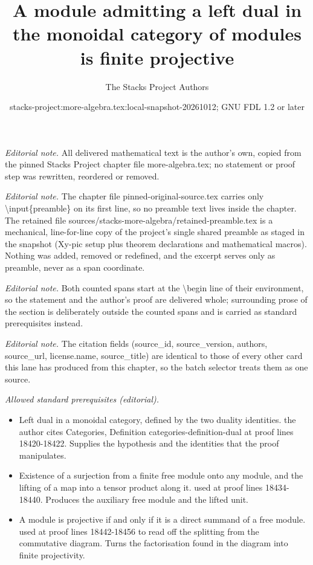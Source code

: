 \documentclass[10pt,a4paper]{amsart}
\title{A module admitting a left dual in the monoidal category of modules is finite projective}
\author{The Stacks Project Authors}
\date{stacks-project:more-algebra.tex:local-snapshot-20261012; GNU FDL 1.2 or later}
\theoremstyle{plain}
\theoremstyle{definition}
\theoremstyle{remark}
\numberwithin{equation}{subsection}
\begin{document}
\maketitle
\setcounter{subsection}{1}
\noindent\textit{Editorial note.} All delivered mathematical text is the author's own, copied from the pinned Stacks Project chapter file more-algebra.tex; no statement or proof step was rewritten, reordered or removed.\par\medskip
\noindent\textit{Editorial note.} The chapter file pinned-original-source.tex carries only \textbackslash{}input\{preamble\} on its first line, so no preamble text lives inside the chapter. The retained file sources/stacks-more-algebra/retained-preamble.tex is a mechanical, line-for-line copy of the project's single shared preamble as staged in the snapshot (Xy-pic setup plus theorem declarations and mathematical macros). Nothing was added, removed or redefined, and the excerpt serves only as preamble, never as a span coordinate.\par\medskip
\noindent\textit{Editorial note.} Both counted spans start at the \textbackslash{}begin line of their environment, so the statement and the author's proof are delivered whole; surrounding prose of the section is deliberately outside the counted spans and is carried as standard prerequisites instead.\par\medskip
\noindent\textit{Editorial note.} The citation fields (source\_id, source\_version, authors, source\_url, license.name, source\_title) are identical to those of every other card this lane has produced from this chapter, so the batch selector treats them as one source.\par\medskip
\noindent\textit{Allowed standard prerequisites (editorial).}\begin{itemize}
\item Left dual in a monoidal category, defined by the two duality identities. the author cites Categories, Definition categories-definition-dual at proof lines 18420-18422. Supplies the hypothesis and the identities that the proof manipulates.
\item Existence of a surjection from a finite free module onto any module, and the lifting of a map into a tensor product along it. used at proof lines 18434-18440. Produces the auxiliary free module and the lifted unit.
\item A module is projective if and only if it is a direct summand of a free module. used at proof lines 18442-18456 to read off the splitting from the commutative diagram. Turns the factorisation found in the diagram into finite projectivity.
\end{itemize}\medskip
\end{document}
